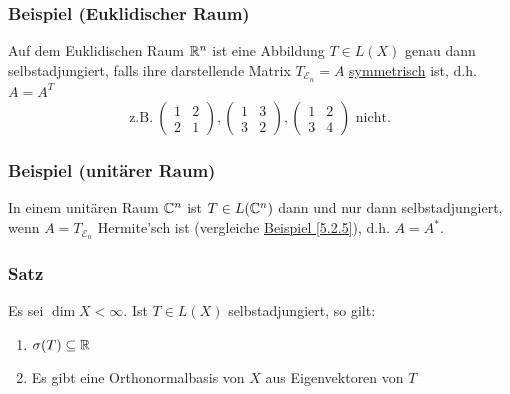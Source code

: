 \subsubsection{Beispiel (Euklidischer Raum)}
Auf dem Euklidischen Raum $\mathbb{R} ^n$ ist eine Abbildung $T\in L(X)$ genau dann selbstadjungiert, falls ihre darstellende Matrix $T_{\mathcal{E}_n}=A$ \underline{symmetrisch} ist, d.h. $A=A^T$
\[\text{z.B.}\ \begin{pmatrix}1 & 2\\ 2 & 1\end{pmatrix},\begin{pmatrix}1 & 3\\ 3 & 2\end{pmatrix}, \begin{pmatrix}1 & 2\\ 3 & 4\end{pmatrix}\text{ nicht.}\]
\subsubsection{Beispiel (unitärer Raum)}
In einem unitären Raum $\mathbb{C} ^n$ ist $T\in L(\mathbb{C} ^n)$ dann und nur dann selbstadjungiert, wenn $A=T_{\mathcal{E}_n}$ Hermite'sch ist (vergleiche \hyperref[5.2.5]{Beispiel \ref{5.2.5}}), d.h. $A=A^*$.
\addtocounter{subsubsection}{1}
\subsubsection{Satz}
Es sei $\dim X<\infty$.  Ist $T\in L(X)$ selbstadjungiert, so gilt:
\alphabet
\begin{enumerate}
\item $\sigma (T)\subseteq \mathbb{R}$
\item Es gibt eine Orthonormalbasis von $X$ aus Eigenvektoren von $T$
\end{enumerate}

